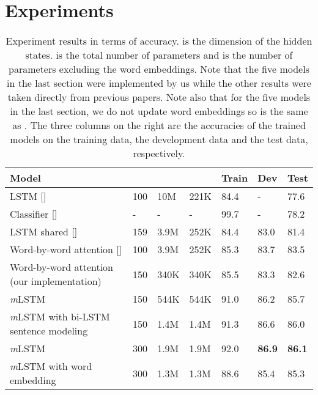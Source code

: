 \documentclass[11pt,letterpaper]{article}
\begin{document}
 \section{Experiments}

\begin{table*}[t]
	\centering
	\small
	\begin{tabular}{lllllll}
		\toprule
		Model                  &    &  &  & Train & Dev  & Test \\ 
		\midrule
		LSTM [\newcite{bowman:emnlp15}]                  & 100 & 10M            & 221K         & 84.4  & -    & 77.6 \\
		Classifier [\newcite{bowman:emnlp15}]             & -   & -              & -            & 99.7  & -    & 78.2 \\ 
		\midrule
		LSTM shared [\newcite{rocktaschel:iclr16}]           & 159 & 3.9M           & 252K         & 84.4  & 83.0 & 81.4 \\
		Word-by-word attention [\newcite{rocktaschel:iclr16}] & 100 & 3.9M           & 252K         & 85.3  & 83.7 & 83.5 \\ \midrule
		Word-by-word attention (our implementation)  & 150 & 340K           & 340K         & 85.5  & 83.3 & 82.6 \\ 
		\emph{m}LSTM     & 150 &         544K       &     544K        & 91.0    & 86.2 & 85.7 \\
		\emph{m}LSTM with bi-LSTM sentence modeling     & 150 &         1.4M       &     1.4M        & 91.3    & 86.6 & 86.0 \\ 
		\emph{m}LSTM     & 300 &         1.9M       &     1.9M        & 92.0    & \textbf{86.9} & \textbf{86.1} \\
		\emph{m}LSTM with word embedding     & 300 &        1.3M        &            1.3M &  88.6   & 85.4 & 85.3 \\
		\bottomrule
	\end{tabular}
	\normalsize
	\caption{Experiment results in terms of accuracy.
		 is the dimension of the hidden states.
		 is the total number of parameters and  is the number of parameters excluding the word embeddings.
		Note that the five models in the last section were implemented by us while the other results were taken directly from previous papers.
		Note also that for the five models in the last section, we do not update word embeddings so   is the same as .
		The three columns on the right are the accuracies of the trained models on the training data, the development data and the test data, respectively.} 
	\label{tab:results}
\end{table*}
\end{document}
